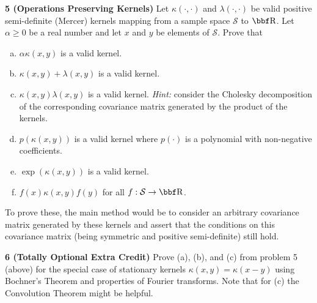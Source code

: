 \documentclass[12pt,letterpaper,fleqn]{hmcpset}
\begin{document}
\textbf{5 (Operations Preserving Kernels)} Let $\kappa(\cdot,\cdot)$ and $\lambda(\cdot,\cdot)$ be valid positive
semi-definite (Mercer) kernels mapping from a sample space $\mathcal{S}$ to $\RR$. Let $\alpha \geq 0$ be a real number
and let $x$ and $y$ be elements of $\mathcal{S}$. Prove that
\begin{enumerate}[(a)]
    \item $\alpha\kappa(x,y)$ is a valid kernel.
    \item $\kappa(x,y) + \lambda(x,y)$ is a valid kernel.
    \item $\kappa(x,y)\lambda(x,y)$ is a valid kernel. \textit{Hint:} consider the Cholesky decomposition
        of the corresponding covariance matrix generated by the product of the kernels.
    \item $p(\kappa(x,y))$ is a valid kernel where $p(\cdot)$ is a polynomial
        with non-negative coefficients.
    \item $\exp(\kappa(x,y))$ is a valid kernel.
    \item $f(x)\kappa(x,y)f(y)$ for all $f : \mathcal{S}\to\RR$.
\end{enumerate}
To prove these, the main method would be to consider an arbitrary covariance matrix
generated by these kernels and assert that the conditions on this covariance matrix (being
symmetric and positive semi-definite) still hold.

\textbf{6 (Totally Optional Extra Credit)} Prove (a), (b), and (c) from problem 5 (above) for the special
case of stationary kernels $\kappa(x,y) = \kappa(x-y)$ using Bochner's Theorem and properties of
Fourier transforms. Note that for (c) the Convolution Theorem might be helpful.
\end{document}
